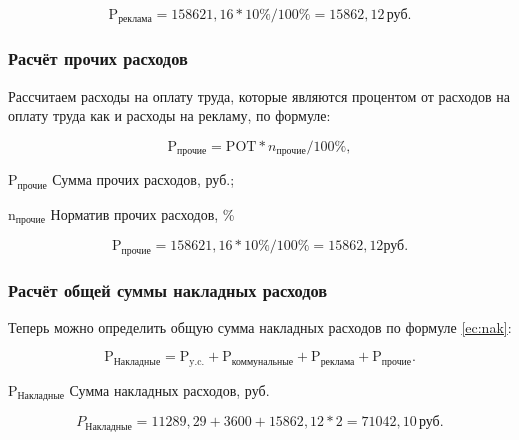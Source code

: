 \begin{equation*}
    \text{P}_\text{реклама} = 158621,16 * 10\% / 100\% = 15862,12 \, \text{руб}.
\end{equation*}

\subsubsection{Расчёт прочих расходов}

Рассчитаем расходы на оплату труда, которые являются процентом от расходов
на оплату труда как и расходы на рекламу, по формуле:

\begin{equation}
    \text{P}_\text{прочие} = \text{POT} * n_\text{прочие} / 100\%,
\end{equation}

\begin{eqexpl}[6ex]
    \item{$\text{P}_\text{прочие}$} Сумма прочих расходов, руб.;
    \item{$\text{n}_\text{прочие}$} Норматив прочих расходов, \%
\end{eqexpl}

\begin{equation*}
    \text{P}_\text{прочие} =  158621,16 * 10\% / 100\% = 15862,12 \text{руб}.
\end{equation*}

\subsubsection{Расчёт общей суммы накладных расходов}

Теперь можно определить общую сумма накладных расходов по формуле \ref{ec:nak}:

\begin{equation}
    \label{ec:nak}
    \text{P}_\text{Накладные} = \text{P}_\text{y.c.} + \text{P}_\text{коммунальные} + \text{P}_\text{реклама} + \text{P}_\text{прочие}.
\end{equation}

\begin{eqexpl}[9ex]
    \item{$\text{P}_\text{Накладные}$} Сумма накладных расходов, руб.
\end{eqexpl}

\begin{equation*}
    P_\text{Накладные} = 11289,29 + 3600 + 15862,12 * 2 = 71042,10 \, \text{руб.}
\end{equation*}


